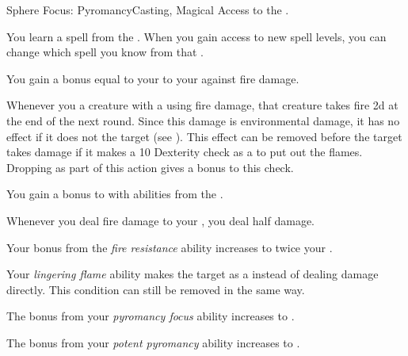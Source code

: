     \begin{feat}{Sphere Focus: Pyromancy}{Casting, Magical}
        \featpre Access to the  .

         You learn a spell from the  .
        When you gain access to new spell levels, you can change which spell you know from that .

         You gain a bonus equal to your  to your  against fire damage.

         Whenever you  a creature with a  using fire damage, that creature takes  fire  \minus2d at the end of the next round.
        Since this damage is environmental damage, it has no effect if it does not  the target (see ).
        This effect can be removed before the target takes damage if it makes a  10 Dexterity check as a  to put out the flames.
        Dropping  as part of this action gives a  bonus to this check.

         You gain a  bonus to  with abilities from the  .

         Whenever you deal fire damage to your , you deal half damage.

         Your bonus from the \textit{fire resistance} ability increases to twice your .

         Your \textit{lingering flame} ability makes the target  as a  instead of dealing damage directly.
        This condition can still be removed in the same way.

         The bonus from your \textit{pyromancy focus} ability increases to .

         The bonus from your \textit{potent pyromancy} ability increases to .
    \end{feat}

